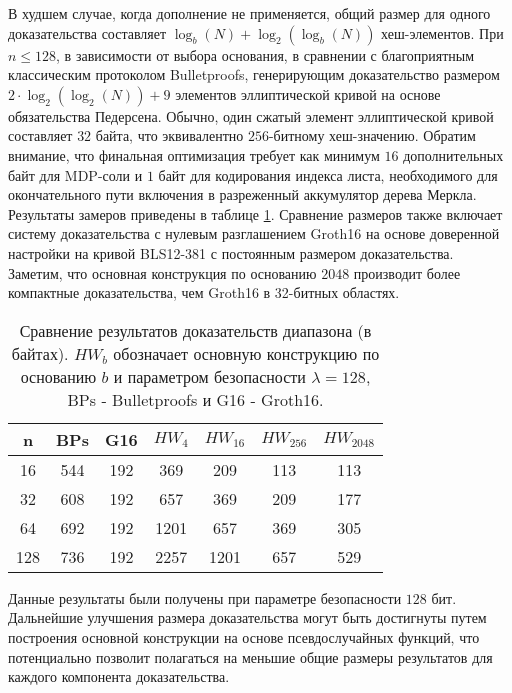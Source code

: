 В худшем случае, когда дополнение не применяется, общий размер для одного доказательства составляет $\log_b(N) + \log_2(\log_b(N))$ хеш-элементов.
При $n \leq 128$, в зависимости от выбора основания, в сравнении с благоприятным классическим протоколом Bulletproofs, генерирующим доказательство размером $2 \cdot \log_2(\log_2(N)) + 9$ элементов эллиптической кривой на основе обязательства Педерсена.
Обычно, один сжатый элемент эллиптической кривой составляет $32$ байта, что эквивалентно $256$-битному хеш-значению.
Обратим внимание, что финальная оптимизация требует как минимум $16$ дополнительных байт для MDP-соли и $1$ байт для кодирования индекса листа, необходимого для окончательного пути включения в разреженный аккумулятор дерева Меркла.
Результаты замеров приведены в таблице \ref{table:1}.
Сравнение размеров также включает систему доказательства с нулевым разглашением Groth16 \cite{cryptoeprint:2016/260} на основе доверенной настройки на кривой BLS12-381 с постоянным размером доказательства.
Заметим, что основная конструкция по основанию $2048$ производит более компактные доказательства, чем Groth16 в 32-битных областях.

\begin{table}[h]
	\centering
    \begin{tabular}{|c|c|c|c|c|c|c|}
        \hline
        n   & BPs & G16 & $HW_4$  & $HW_{16}$ & $HW_{256}$ & $HW_{2048}$ \\ \hline
        16  & 544 & 192 & 369     & 209       & 113        & 113         \\ \hline
        32  & 608 & 192 & 657     & 369       & 209        & 177         \\ \hline
        64  & 692 & 192 & 1201    & 657       & 369        & 305         \\ \hline
        128 & 736 & 192 & 2257    & 1201      & 657        & 529         \\ \hline
    \end{tabular}
	\label{table:1}
	\caption{Сравнение результатов доказательств диапазона (в байтах). $HW_b$ обозначает основную конструкцию по основанию $b$ и параметром безопасности $\lambda = 128$, BPs - Bulletproofs и G16 - Groth16.}
\end{table}

Данные результаты были получены при параметре безопасности $128$ бит.
Дальнейшие улучшения размера доказательства могут быть достигнуты путем построения основной конструкции на основе псевдослучайных функций, что потенциально позволит полагаться на меньшие общие размеры результатов для каждого компонента доказательства.

